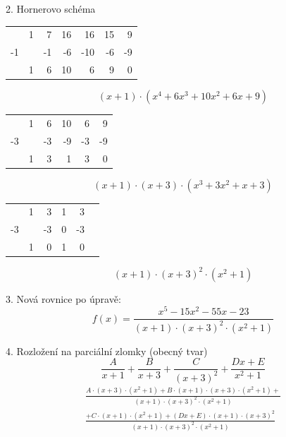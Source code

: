 \documentclass[a4paper, 11pt]{article}
\begin{document}
	\bigskip
	
	2. Hornerovo schéma
	\begin{table}[h]
		\centering
		\begin{tabular}{rrrrrrr}
			& 1 & 7  & 16 & 16  & 15 & 9  \\
			-1 &   & -1 & -6 & -10 & -6 & -9 \\
			& 1 & 6  & 10 & 6   & 9  & 0 
		\end{tabular}
	\end{table}
	\begin{equation}
	(x+1)\cdot(x^4+6x^3+10x^2+6x+9)
	\end{equation}
	
	\begin{table}[h]
		\centering
		\begin{tabular}{rrrrrr}
			& 1 & 6  & 10 & 6  & 9  \\
			-3 &   & -3 & -9 & -3 & -9 \\
			& 1 & 3  & 1  & 3  & 0 
		\end{tabular}
	\end{table}
	\begin{equation}
	(x+1)\cdot(x+3)\cdot(x^3+3x^2+x+3)
	\end{equation}
	
	\begin{table}[h]
		\centering
		\begin{tabular}{rrrrrr}
			& 1 & 3  & 1 & 3  \\
			-3 &   & -3 & 0 & -3 \\
			& 1 & 0  & 1 & 0 
		\end{tabular}
	\end{table}
	\begin{equation}
	(x+1)\cdot(x+3)^2\cdot(x^2+1)
	\end{equation}
	
	\bigskip
	
	3. Nová rovnice po úpravě:
	\begin{equation}
	f(x) = \frac{x^5-15x^2-55x-23}{(x+1)\cdot(x+3)^2\cdot(x^2+1)}	
	\end{equation}
	
	\bigskip
	
	4. Rozložení na parciální zlomky (obecný tvar)
	\begin{equation}
	\frac{A}{x+1}+\frac{B}{x+3}+\frac{C}{(x+3)^2}+\frac{Dx+E}{x^2+1}
	\end{equation}
	\begin{equation}
	\begin{split}
	\frac{A\cdot(x+3)\cdot(x^2+1) + B\cdot(x+1)\cdot(x+3)\cdot(x^2+1)+}{(x+1)\cdot(x+3)^2\cdot(x^2+1)} \\
	\frac{+C\cdot(x+1)\cdot(x^2+1)+(Dx+E)\cdot(x+1)\cdot(x+3)^2}{(x+1)\cdot(x+3)^2\cdot(x^2+1)}
	\end{split}
	\end{equation}
	
\end{document}
